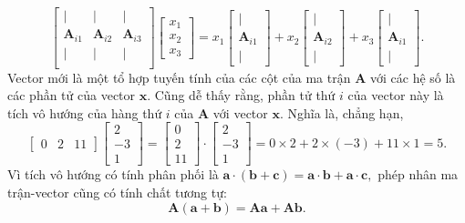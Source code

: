 \[\begin{bmatrix}
    \vert &\vert&\vert\\
    \mathbf{A}_{i1}&\mathbf{A}_{i2}&\mathbf{A}_{i3}\\
    \vert &\vert&\vert\\
\end{bmatrix}\begin{bmatrix}
    x_1\\x_2\\x_3
\end{bmatrix}=x_1\begin{bmatrix}
    \vert\\\mathbf{A}_{i1}\\ \vert
\end{bmatrix}+x_2 \begin{bmatrix}
    \vert\\\mathbf{A}_{i2}\\ \vert
\end{bmatrix}+x_3\begin{bmatrix}
    \vert\\\mathbf{A}_{i1}\\ \vert
\end{bmatrix}.\]
Vector mới là một tổ hợp tuyến tính của các cột của ma trận \(\mathbf{A}\) với các hệ số là các phần tử của vector \(\mathbf{x}\). Cũng dễ thấy rằng, phần tử thứ \(i\) của vector này là tích vô hướng của hàng thứ \(i\) của \(\mathbf{A}\) với vector \(\mathbf{x}\). Nghĩa là, chẳng hạn, 
\[\begin{bmatrix}
    0&2&11
\end{bmatrix}\begin{bmatrix}
    2\\-3\\1
\end{bmatrix}=\begin{bmatrix}
    0\\2\\11
\end{bmatrix}\cdot \begin{bmatrix}
    2\\-3\\1
\end{bmatrix}=0\times 2+2\times(-3)+11\times 1 =5.\]
Vì tích vô hướng có tính phân phối là \(\mathbf{a}\cdot(\mathbf{b}+\mathbf{c})=\mathbf{a}\cdot\mathbf{b}+\mathbf{a}\cdot\mathbf{c},\)
phép nhân ma trận-vector cũng có tính chất tương tự: \[\mathbf{A}(\mathbf{a}+\mathbf{b})=\mathbf{A}\mathbf{a}+\mathbf{A}\mathbf{b}.\]
\vspace{8pt}

